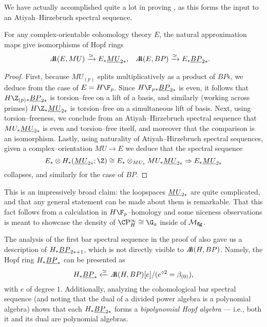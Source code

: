 We have actually accomplished quite a lot in proving , as this forms the input to an Atiyah--Hirzebruch spectral sequence.

\begin{corollary}\label{HopfRingForEBP}
For any complex-orientable cohomology theory $E$, the natural approximation maps give isomorphisms of Hopf rings
\begin{align*}
\AA(E, MU)  & \xrightarrow{\simeq} E_* \OS{MU}{2*}, &
\AA(E, BP) & \xrightarrow{\simeq} E_* \OS{BP}{2*}.
\end{align*}
\end{corollary}
\begin{proof}
First, because $MU_{(p)}$ splits multiplicatively as a product of $BP$s, we deduce from  the case of $E = H\F_p$.  Since $H\F_p{}_* \OS{BP}{2*}$ is even, it follows that $H\Z_{(p)}{}_* \OS{BP}{2*}$ is torsion--free on a lift of a basis, and similarly (working across primes) $H\Z_* \OS{MU}{2*}$ is torsion--free on a simultaneous lift of basis.  Next, using torsion--freeness, we conclude from an Atiyah--Hirzebruch spectral sequence that $MU_* \OS{MU}{2*}$ is even and torsion--free itself, and moreover that the comparison is an isomorphism.  Lastly, using naturality of Atiyah--Hirzebruch spectral sequences, given a complex--orientation $MU \to E$ we deduce that the spectral sequence \[E_* \otimes H_*(\OS{MU}{2*}; \Z) \cong E_* \otimes_{MU_*} MU_* \OS{MU}{2*} \Rightarrow E_* \OS{MU}{2*}\] collapses, and similarly for the case of $BP$.
\end{proof}

This is an impressively broad claim: the loopspaces $\OS{MU}{2*}$ are quite complicated, and that any general statement can be made about them is remarkable.  That this fact follows from a calculation in $H\F_p$--homology and some niceness observations is meant to showcase the density of $\CP^\infty_H \cong \G_a$ inside of $\moduli{fg}$.

\begin{remark}
The analysis of the first bar spectral sequence in the proof of  also gave us a description of $H_* \OS{BP}{2*+1}$, which is not directly visible to $\AA(H, BP)$.  Namely, the Hopf ring $H_* \OS{BP}{*}$ can be presented as \[H_* \OS{BP}{*} \xleftarrow{\simeq} \AA(H, BP)[e] / (e^{\circ 2} = \beta_{(0)}),\] with $e$ of degree $1$.  Additionally, analyzing the cohomological bar spectral sequence (and noting that the dual of a divided power algebra is a polynomial algebra) shows that each $H_* \OS{BP}{2*}$ forms a \textit{bipolynomial Hopf algebra} --- i.e., both it and its dual are polynomial algebras.
\end{remark}

